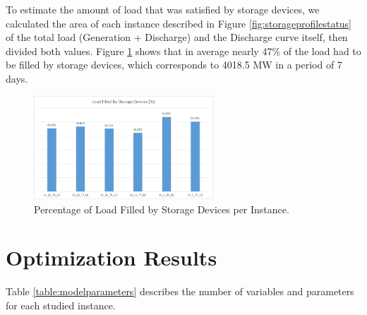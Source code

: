 \documentclass[12pt,LUDisStyle,twosided]{book}
\begin{document}
To estimate the amount of load that was satisfied by storage devices, we calculated the area of each instance described in Figure \ref{fig:storageprofilestatus} of the total load (Generation + Discharge) and the Discharge curve itself, then divided both values. Figure \ref{fig:loadfilled} shows that in average nearly 47\% of the load had to be filled by storage devices, which corresponds to 4018.5 MW in a period of 7 days.

\begin{figure}[H] 
	\begin{center}
		\includegraphics[width=0.6\textwidth,keepaspectratio]{loadfilledstorage.png}
	  	\caption{Percentage of Load Filled by Storage Devices per Instance.}
     	\label{fig:loadfilled}
	\end{center}
\end{figure}

\newpage
\section{Optimization Results} \label{section:optimizationresults}

Table \ref{table:modelparameters} describes the number of variables and parameters for each studied instance. 
\end{document}

